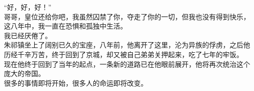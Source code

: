 \begin{multicols}{\theparacolNo}
“好，好，好！”\\

哥哥，皇位还给你吧，我虽然囚禁了你，夺走了你的一切，但我也没有得到快乐，这八年中，我一直在恐惧和孤独中生活。\\

我已经厌倦了。\\

朱祁镇坐上了阔别已久的宝座，八年前，他离开了这里，沦为异族的俘虏，之后他历经千辛万苦，终于回到了京城，却又被自己弟弟关押起来，吃了七年的牢饭。\\

现在他终于回到了当年的起点，一条新的道路已在他眼前展开，他将再次统治这个庞大的帝国。\\

很多的事情即将开始，很多人的命运即将改变。\\
\ifnum{}
	\end{multicols}
\fi
